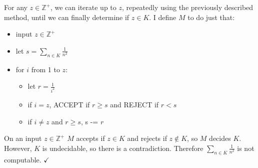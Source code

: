 \documentclass[11pt]{article}
\begin{document}
For any $z \in \mathbb{Z}^+$, we can iterate up to $z$, repeatedly using the previously described method, until we can finally determine if $z \in K$.
I define $M$ to do just that:
\begin{itemize}
	\item input $z \in \mathbb{Z}^+$
	\item let $s = \sum _{n\in K} \frac{1}{n^2}$
	\item for $i$ from 1 to $z$:
	\begin{itemize}
		\item let $r = \frac{1}{i^2}$
		\item if $i = z$, ACCEPT if $r \geq s$ and REJECT if $r < s$
		\item if $i \neq z$ and $r \geq s$, s -= $r$
	\end{itemize}
\end{itemize}

On an input $z \in \mathbb{Z}^+$ $M$ accepts if $z \in K$ and rejects if $z \notin K$, so $M$ decides $K$.
However, $K$ is undecidable, so there is a contradiction.
Therefore $\sum _{n \in K} \frac{1}{n^2}$ is not computable. $\checkmark$
\end{document}
